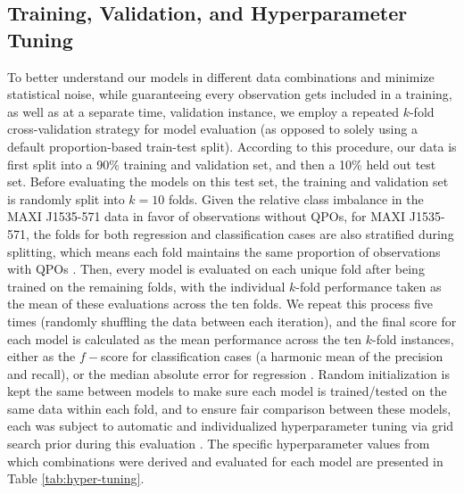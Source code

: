 \documentclass[fleqn,usenatbib,twocolumn]{mnras}%
\begin{document}
\subsection{Training, Validation, and Hyperparameter Tuning}\label{subsec:train_validate_tune}

To better understand our models in different data combinations and minimize statistical noise, while guaranteeing every observation gets included in a training, as well as at a separate time, validation instance, we employ a repeated $k$-fold cross-validation strategy \citep{olson2008advanced,repeatedkfold} for model evaluation (as opposed to solely using a default proportion-based train-test split). According to this procedure, our data is first split into a 90\% training and validation set, and then a 10\% held out test set. Before evaluating the models on this test set, the training and validation set is randomly split into $k=10$ folds. Given the relative class imbalance in the MAXI J1535-571 data in favor of observations without QPOs, for MAXI J1535-571, the folds for both regression and classification cases are also stratified during splitting, which means each fold maintains the same proportion of observations with QPOs \citep{ma2013imbalanced}. Then, every model is evaluated on each unique fold after being trained on the remaining folds, with the individual $k$-fold performance taken as the mean of these evaluations across the ten folds. We repeat this process five times (randomly shuffling the data between each iteration), and the final score for each model is calculated as the mean performance across the ten $k$-fold instances, either as the $f-$score for classification cases (a harmonic mean of the precision and recall), or the median absolute error for regression \citep{scikit-learn,kuhn2019applied}. Random initialization is kept the same between models to make sure each model is trained/tested on the same data within each fold, and to ensure fair comparison between these models, each was subject to automatic and individualized hyperparameter tuning via grid search prior during this evaluation \citep{dangeti2017statisticsML}. The specific hyperparameter values from which combinations were derived and evaluated for each model are presented in Table \ref{tab:hyper-tuning}. 

\end{document}
